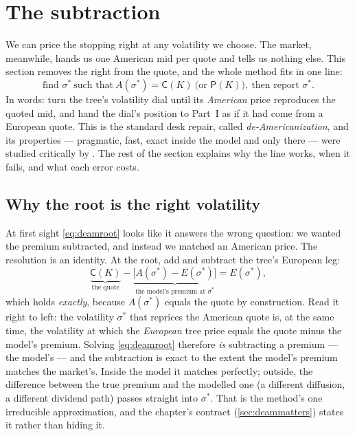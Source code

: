 \section{The subtraction}
\label{sec:deamsub}

We can price the stopping right at any volatility we choose.  The
market, meanwhile, hands us one American mid per quote and tells us
nothing else.  This section removes the right from the quote, and the
whole method fits in one line:
\begin{equation}
\boxed{\;\text{find }\sigma^*\ \text{such that}\
A(\sigma^*)=\mathsf{C}(K)\ \text{(or } \mathsf{P}(K)\text{)},\
\text{then report }\sigma^*.\;}
\label{eq:deamroot}
\end{equation}
In words: turn the tree's volatility dial until its \emph{American}
price reproduces the quoted mid, and hand the dial's position to
Part~I as if it had come from a European quote.  This is the standard
desk repair, called \emph{de-Americanization}, and its properties ---
pragmatic, fast, exact inside the model and only there --- were
studied critically by \citet{Burkovska2018}.  The rest of the section
explains why the line works, when it fails, and what each error costs.

\subsection{Why the root is the right volatility}

At first sight \eqref{eq:deamroot} looks like it answers the wrong
question: we wanted the premium subtracted, and instead we matched an
American price.  The resolution is an identity.  At the root, add and
subtract the tree's European leg:
\begin{equation}
\underbrace{\mathsf{C}(K)}_{\text{the quote}}
-\underbrace{\big[A(\sigma^*)-E(\sigma^*)\big]}_{\text{the model's
premium at }\sigma^*}
=E(\sigma^*),
\label{eq:deamcv}
\end{equation}
which holds \emph{exactly}, because $A(\sigma^*)$ equals the quote by
construction.  Read it right to left: the volatility $\sigma^*$ that
reprices the American quote is, at the same time, the volatility at
which the \emph{European} tree price equals the quote minus the
model's premium.  Solving \eqref{eq:deamroot} therefore \emph{is}
subtracting a premium --- the model's --- and the subtraction is
exact to the extent the model's premium matches the market's.  Inside
the model it matches perfectly; outside, the difference between the
true premium and the modelled one (a different diffusion, a different
dividend path) passes straight into $\sigma^*$.  That is the method's
one irreducible approximation, and the chapter's contract
(\cref{sec:deammatters}) states it rather than hiding it.

